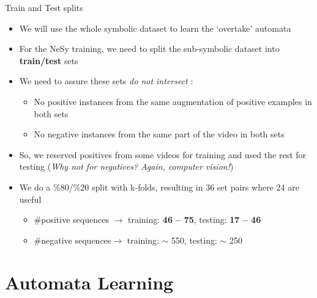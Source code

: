 \documentclass[10pt, aspectratio=169]{beamer}
\begin{document}
\begin{frame}{Train and Test splits}
    \begin{itemize}
        \setlength{\itemsep}{10pt}
        \item We will use the whole symbolic dataset to learn the `overtake' automata
        \item For the NeSy training, we need to split the sub-symbolic dataset into \textbf{train/test} sets
        \item We need to assure these sets \textit{do not intersect} : 
        \vspace{5pt}
        \begin{itemize}
            \setlength{\itemsep}{3pt}
            \item No positive instances from the same augmentation of positive examples in both sets 
            \item No negative instances from the same part of the video in both sets 
        \end{itemize}
        \item So, we reserved positives from some videos for training and used the rest for testing \textcolor{umBlueLighter}{\small (\textit{Why not for negatives? Again, computer vision!})}
        \item We do a \%80/\%20 split with k-folds, resulting in 36 set pairs where 24 are useful 
        \vspace{5pt}
        \begin{itemize}
            \setlength{\itemsep}{3pt}
            \item \#positive sequences $\rightarrow$ training:  \textbf{46 -- 75}, testing: \textbf{17 -- 46} %
            \item \#negative sequences$\rightarrow$ training: $\sim$ 550, testing: $\sim$ 250 
        \end{itemize}
    \end{itemize}
\end{frame}


\section{Automata Learning}
{
    \begin{frame}
        \sectionpage%
    \end{frame}
}
\end{document}
